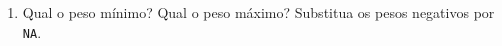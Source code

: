 \documentclass[
  11pt]{report}
\begin{document}
\begin{enumerate}

\item
  Qual o peso mínimo? Qual o peso máximo? Substitua os pesos negativos por \texttt{NA}.

\end{enumerate}
\end{document}
